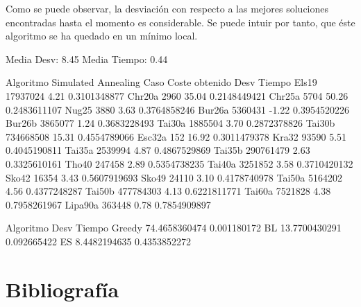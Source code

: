 \documentclass[10pt,a4paper]{article}
\begin{document}
Como se puede observar, la desviación con respecto a las mejores soluciones encontradas hasta el momento es considerable. Se puede intuir por tanto, que éste algoritmo se ha quedado en un mínimo local.

\begin{ccode}
Media Desv: 8.45
Media Tiempo: 0.44

Algoritmo Simulated Annealing
Caso    Coste obtenido  Desv    Tiempo
Els19   17937024    4.21    0.3101348877
Chr20a  2960    35.04   0.2148449421
Chr25a  5704    50.26   0.2483611107
Nug25   3880    3.63    0.3764858246
Bur26a  5360431 -1.22   0.3954520226
Bur26b  3865077 1.24    0.3683228493
Tai30a  1885504 3.70    0.2872378826
Tai30b  734668508   15.31   0.4554789066
Esc32a  152 16.92   0.3011479378
Kra32   93590   5.51    0.4045190811
Tai35a  2539994 4.87    0.4867529869
Tai35b  290761479   2.63    0.3325610161
Tho40   247458  2.89    0.5354738235
Tai40a  3251852 3.58    0.3710420132
Sko42   16354   3.43    0.5607919693
Sko49   24110   3.10    0.4178740978
Tai50a  5164202 4.56    0.4377248287
Tai50b  477784303   4.13    0.6221811771
Tai60a  7521828 4.38    0.7958261967
Lipa90a 363448  0.78    0.7854909897
\end{ccode}

\begin{ccode}
Algoritmo   Desv    Tiempo
Greedy  74.4658360474   0.001180172
BL  13.7700430291   0.092665422
ES  8.4482194635    0.4353852272
\end{ccode}


\section*{Bibliografía}
\printbibliography[heading=bibempty,type=article]
\printbibliography[heading=bibempty,type=misc]
\end{document}
